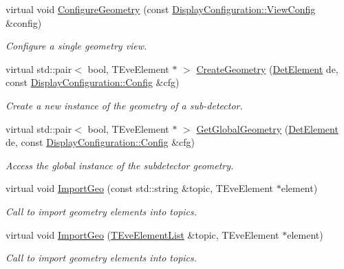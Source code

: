 \begin{DoxyCompactItemize}
virtual void \hyperlink{class_d_d4hep_1_1_view_adefb4cb817819ec62803d34b89bf0988}{Configure\+Geometry} (const \hyperlink{class_d_d4hep_1_1_display_configuration_1_1_view_config}{Display\+Configuration\+::\+View\+Config} \&config)
\begin{DoxyCompactList}\small\item\em Configure a single geometry view. \end{DoxyCompactList}\item 
virtual std\+::pair$<$ bool, T\+Eve\+Element $\ast$ $>$ \hyperlink{class_d_d4hep_1_1_view_aa2325d2c428a2d2523bfb82cd31b7a28}{Create\+Geometry} (\hyperlink{class_d_d4hep_1_1_view_a59eafc8150df21b918b964850ac6c462}{Det\+Element} de, const \hyperlink{class_d_d4hep_1_1_display_configuration_1_1_config}{Display\+Configuration\+::\+Config} \&cfg)
\begin{DoxyCompactList}\small\item\em Create a new instance of the geometry of a sub-\/detector. \end{DoxyCompactList}\item 
virtual std\+::pair$<$ bool, T\+Eve\+Element $\ast$ $>$ \hyperlink{class_d_d4hep_1_1_view_aeb658c5dde010976060874d2ad48107f}{Get\+Global\+Geometry} (\hyperlink{class_d_d4hep_1_1_view_a59eafc8150df21b918b964850ac6c462}{Det\+Element} de, const \hyperlink{class_d_d4hep_1_1_display_configuration_1_1_config}{Display\+Configuration\+::\+Config} \&cfg)
\begin{DoxyCompactList}\small\item\em Access the global instance of the subdetector geometry. \end{DoxyCompactList}\item 
virtual void \hyperlink{class_d_d4hep_1_1_view_acb0bf90adffd4235eaf2ecaa4c4e4bf5}{Import\+Geo} (const std\+::string \&topic, T\+Eve\+Element $\ast$element)
\begin{DoxyCompactList}\small\item\em Call to import geometry elements into topics. \end{DoxyCompactList}\item 
virtual void \hyperlink{class_d_d4hep_1_1_view_a84117a020048c8574aa7186d31f0a0ba}{Import\+Geo} (\hyperlink{class_t_eve_element_list}{T\+Eve\+Element\+List} \&topic, T\+Eve\+Element $\ast$element)
\begin{DoxyCompactList}\small\item\em Call to import geometry elements into topics. \end{DoxyCompactList}\item 

\end{DoxyCompactItemize}
